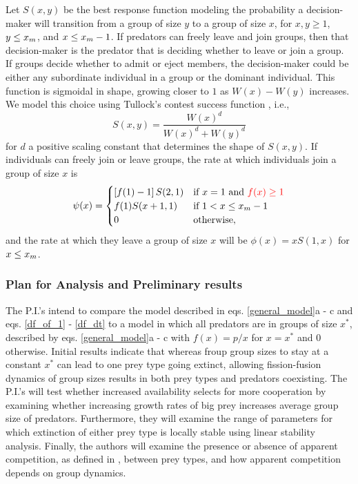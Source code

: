 Let $S(x,y)$ be the best response function modeling the probability a decision-maker will transition from a group of size $y$ to a group of size $x$, for $x,y \geq 1$, $y \leq x_{m}$, and $x \leq x_{m} - 1$. If predators can freely leave and join groups, then that decision-maker is the predator that is deciding whether to leave or join a group. If groups decide whether to admit or eject members, the decision-maker could be either any subordinate individual in a group or the dominant individual. This function is sigmoidal in shape, growing closer to $1$ as $W(x) - W(y)$ increases. We model this choice using Tullock's contest success function \cite{tullock_efficient_1980}, i.e.,
\begin{equation} \label{best_response_function}
S(x,y) = \frac{W(x)^d}{W(x)^d + W(y)^d}
\end{equation}
for $d$ a positive scaling constant that determines the shape of $S(x,y)$. If individuals can freely join or leave groups, the rate at which individuals join a group of size $x$ is
\begin{equation}
\psi(x) = 
\begin{cases}
\left[ f(1) - 1 \right] S(2,1) & \text{if } x = 1 \text{ and } \textcolor{red}{f(x) \geq 1}\\
f(1) S(x+1,1)  & \text{if } 1 < x \leq x_{m} - 1 \\
0 & \text{otherwise},
\end{cases}
\end{equation}
and the rate at which they leave a group of size $x$ will be $\phi(x) = xS(1,x)$ for $x \leq x_{m}$.  

\subsubsection{Plan for Analysis and Preliminary results}
The P.I.'s intend to compare the model described in eqs. \ref{general_model}a - c and eqs. \ref{df_of_1} - \ref{df_dt} to a model in which all predators are in groups of size $x^*$, described by eqs. \ref{general_model}a - c with $f(x) = p/x$ for $x = x^*$ and 0 otherwise. Initial results indicate that whereas froup group sizes to stay at a constant $x^*$ can lead to one prey type going extinct, allowing fission-fusion dynamics of group sizes results in both prey types and predators coexisting. The P.I.'s will test whether increased availability selects for more cooperation by examining whether increasing growth rates of big prey increases average group size of predators. Furthermore, they will examine the range of parameters for which extinction of either prey type is locally stable using linear stability analysis. Finally, the authors will examine the presence or absence of apparent competition, as defined in \cite{holt_predation_1977}, between prey types, and how apparent competition depends on group dynamics.

